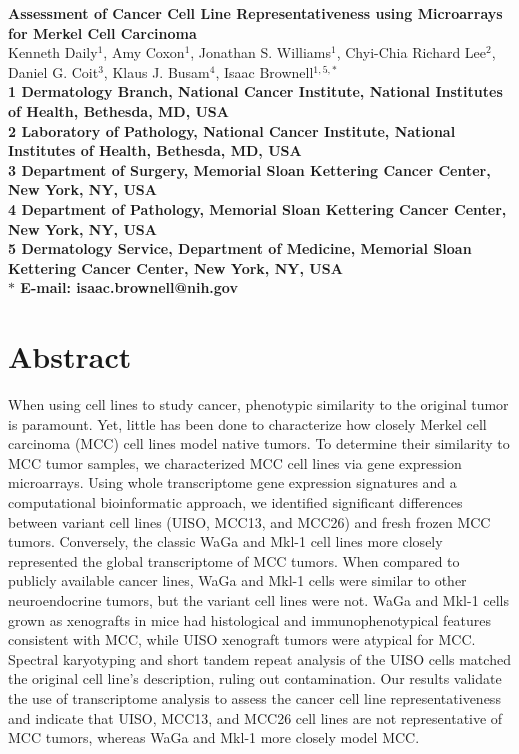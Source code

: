 \documentclass[10pt]{article}
\date{}
\begin{document}
\begin{singlespace}
\begin{flushleft}
{\Large 
\textbf{Assessment of Cancer Cell Line Representativeness using Microarrays for Merkel Cell Carcinoma}
}
\\
Kenneth Daily$^{1}$,
Amy Coxon$^{1}$,
Jonathan S. Williams$^{1}$,
Chyi-Chia Richard Lee$^{2}$,
Daniel G. Coit$^{3}$,
Klaus J. Busam$^{4}$,
Isaac Brownell$^{1,5,\ast}$
\\

\bf{1} Dermatology Branch, National Cancer Institute, National Institutes of Health, Bethesda, MD, USA
\\
\bf{2} Laboratory of Pathology, National Cancer Institute, National Institutes of Health, Bethesda, MD, USA
\\
\bf{3} Department of Surgery, Memorial Sloan Kettering Cancer Center, New York, NY, USA
\\
\bf{4} Department of Pathology, Memorial Sloan Kettering Cancer Center, New York, NY, USA
\\
\bf{5} Dermatology Service, Department of Medicine, Memorial Sloan Kettering Cancer Center, New York, NY, USA
\\

$\ast$ E-mail: isaac.brownell@nih.gov

\end{flushleft}

\end{singlespace}

\section*{Abstract}
When using cell lines to study cancer, phenotypic similarity to the original tumor is paramount.
Yet, little has been done to characterize how closely Merkel cell carcinoma (MCC) cell lines model native tumors.
To determine their similarity to MCC tumor samples, we characterized MCC cell lines via gene expression microarrays.
Using whole transcriptome gene expression signatures and a computational bioinformatic approach, we identified significant differences between variant cell lines (UISO, MCC13, and MCC26) and fresh frozen MCC tumors.
Conversely, the classic WaGa and Mkl-1 cell lines more closely represented the global transcriptome of MCC tumors.
When compared to publicly available cancer lines, WaGa and Mkl-1 cells were similar to other neuroendocrine tumors, but the variant cell lines were not.
WaGa and Mkl-1 cells grown as xenografts in mice had histological and immunophenotypical features consistent with MCC, while UISO xenograft tumors were atypical for MCC.
Spectral karyotyping and short tandem repeat analysis of the UISO cells matched the original cell line's description, ruling out contamination.
Our results validate the use of transcriptome analysis to assess the cancer cell line representativeness and indicate that UISO, MCC13, and MCC26 cell lines are not representative of MCC tumors, whereas WaGa and Mkl-1 more closely model MCC.
\end{document}
